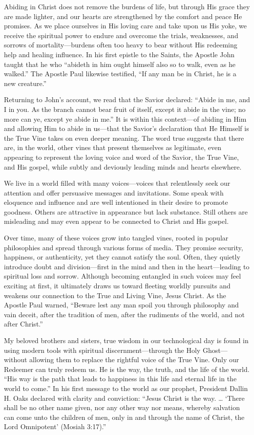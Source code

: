 \documentclass[letterpaper, 11pt]{report}
\begin{document}
Abiding in Christ does not remove the burdens of life, but through His grace they are made lighter, and our hearts are strengthened by the comfort and peace He promises. As we place ourselves in His loving care and take upon us His yoke, we receive the spiritual power to endure and overcome the trials, weaknesses, and sorrows of mortality—burdens often too heavy to bear without His redeeming help and healing influence. In his first epistle to the Saints, the Apostle John taught that he who “abideth in him ought himself also so to walk, even as he walked.” The Apostle Paul likewise testified, “If any man be in Christ, he is a new creature.”

Returning to John’s account, we read that the Savior declared: “Abide in me, and I in you. As the branch cannot bear fruit of itself, except it abide in the vine; no more can ye, except ye abide in me.” It is within this context—of abiding in Him and allowing Him to abide in us—that the Savior’s declaration that He Himself is the True Vine takes on even deeper meaning. The word true suggests that there are, in the world, other vines that present themselves as legitimate, even appearing to represent the loving voice and word of the Savior, the True Vine, and His gospel, while subtly and deviously leading minds and hearts elsewhere.

We live in a world filled with many voices—voices that relentlessly seek our attention and offer persuasive messages and invitations. Some speak with eloquence and influence and are well intentioned in their desire to promote goodness. Others are attractive in appearance but lack substance. Still others are misleading and may even appear to be connected to Christ and His gospel.

Over time, many of these voices grow into tangled vines, rooted in popular philosophies and spread through various forms of media. They promise security, happiness, or authenticity, yet they cannot satisfy the soul. Often, they quietly introduce doubt and division—first in the mind and then in the heart—leading to spiritual loss and sorrow. Although becoming entangled in such voices may feel exciting at first, it ultimately draws us toward fleeting worldly pursuits and weakens our connection to the True and Living Vine, Jesus Christ. As the Apostle Paul warned, “Beware lest any man spoil you through philosophy and vain deceit, after the tradition of men, after the rudiments of the world, and not after Christ.”

My beloved brothers and sisters, true wisdom in our technological day is found in using modern tools with spiritual discernment—through the Holy Ghost—without allowing them to replace the rightful voice of the True Vine. Only our Redeemer can truly redeem us. He is the way, the truth, and the life of the world. “His way is the path that leads to happiness in this life and eternal life in the world to come.” In his first message to the world as our prophet, President Dallin H. Oaks declared with clarity and conviction: “Jesus Christ is the way. … ‘There shall be no other name given, nor any other way nor means, whereby salvation can come unto the children of men, only in and through the name of Christ, the Lord Omnipotent’ (Mosiah 3:17).”
\end{document}
